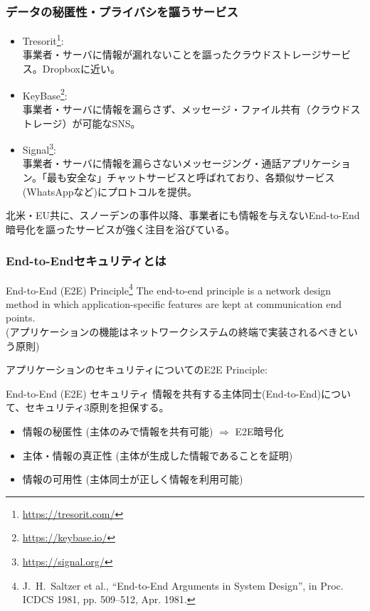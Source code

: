 \documentclass[12pt,dvipdfmx]{beamer}
\begin{document}
\begin{frame}
\frametitle{データの秘匿性・プライバシを謳うサービス}
\small 
\begin{itemize}
\item Tresorit\footnote[frame]{\scriptsize \url{https://tresorit.com/}}:\\
事業者・サーバに情報が漏れないことを謳ったクラウドストレージサービス。Dropboxに近い。

\item KeyBase\footnote[frame]{\scriptsize \url{https://keybase.io/}}:\\
事業者・サーバに情報を漏らさず、メッセージ・ファイル共有（クラウドストレージ）が可能なSNS。

\item Signal\footnote[frame]{\scriptsize \url{https://signal.org/}}:\\
事業者・サーバに情報を漏らさないメッセージング・通話アプリケーション。「最も安全な」チャットサービスと呼ばれており、各類似サービス(WhatsAppなど)にプロトコルを提供。
\end{itemize}

北米・EU共に、スノーデンの事件以降、事業者にも情報を与えない\alert{End-to-End暗号化}を謳ったサービスが強く注目を浴びている。
\end{frame}

\begin{frame}
\frametitle{End-to-Endセキュリティとは}
\begin{block}{End-to-End (E2E) Principle\footnote[frame]{\scriptsize J.~H.~Saltzer et al.\@, ``End-to-End Arguments in System Design'', in Proc. ICDCS 1981, pp. 509--512, Apr. 1981.}}
The end-to-end principle is a network design method in which \alert{application-specific features are kept at communication end points}.\\[1ex]
(アプリケーションの機能はネットワークシステムの\alert{終端}で実装されるべきという原則)
\end{block}
\end{frame}

\begin{frame}
アプリケーションのセキュリティについてのE2E Principle:
\begin{block}{End-to-End (E2E) セキュリティ}
情報を共有する主体同士(End-to-End)について、セキュリティ3原則を担保する。
\begin{itemize}
 \item 情報の秘匿性 (主体のみで情報を共有可能) $\Rightarrow$ \alert{E2E暗号化}
 \item 主体・情報の真正性 (主体が生成した情報であることを証明)
 \item 情報の可用性 (主体同士が正しく情報を利用可能)
\end{itemize}
\end{block}

\end{frame}
\end{document}
